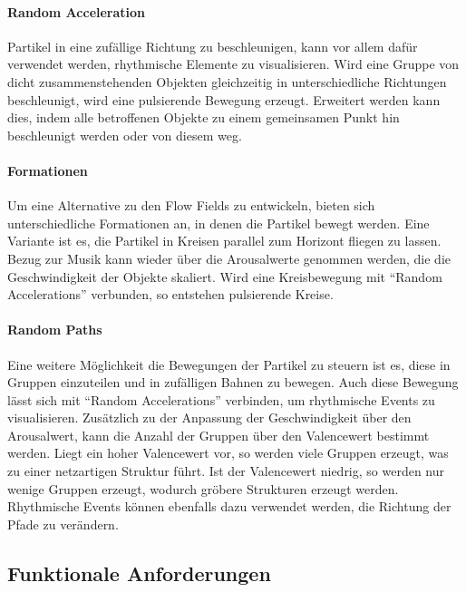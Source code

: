 \documentclass[11pt,a4paper]{article}
\begin{document}
\paragraph{Random Acceleration}
Partikel in eine zufällige Richtung zu beschleunigen, kann vor allem dafür verwendet werden, rhythmische Elemente zu visualisieren. Wird eine Gruppe von dicht zusammenstehenden Objekten gleichzeitig in unterschiedliche Richtungen beschleunigt, wird eine pulsierende Bewegung erzeugt. Erweitert werden kann dies, indem alle betroffenen Objekte zu einem gemeinsamen Punkt hin beschleunigt werden oder von diesem weg.

\paragraph{Formationen}
Um eine Alternative zu den Flow Fields zu entwickeln, bieten sich unterschiedliche Formationen an, in denen die Partikel bewegt werden. Eine Variante ist es, die Partikel in Kreisen parallel zum Horizont fliegen zu lassen.\\
Bezug zur Musik kann wieder über die Arousalwerte genommen werden, die die Geschwindigkeit der Objekte skaliert. Wird eine Kreisbewegung mit ``Random Accelerations'' verbunden, so entstehen pulsierende Kreise.

\paragraph{Random Paths}
Eine weitere Möglichkeit die Bewegungen der Partikel zu steuern ist es, diese in Gruppen einzuteilen und in zufälligen Bahnen zu bewegen. Auch diese Bewegung lässt sich mit ``Random Accelerations'' verbinden, um rhythmische Events zu visualisieren. Zusätzlich zu der Anpassung der Geschwindigkeit über den Arousalwert, kann die Anzahl der Gruppen über den Valencewert bestimmt werden. Liegt ein hoher Valencewert vor, so werden viele Gruppen erzeugt, was zu einer netzartigen Struktur führt. Ist der Valencewert niedrig, so werden nur wenige Gruppen erzeugt, wodurch gröbere Strukturen erzeugt werden.\\
Rhythmische Events können ebenfalls dazu verwendet werden, die Richtung der Pfade zu verändern.

\newpage
\subsection{Funktionale Anforderungen}
\end{document}
